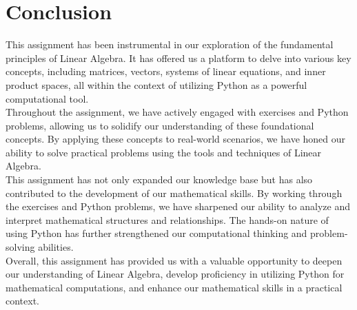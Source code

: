 \clearpage
\section{ Conclusion}
This assignment has been instrumental in our exploration of the fundamental principles of Linear Algebra. It has offered us a platform to delve into various key concepts, including matrices, vectors, systems of linear equations, and inner product spaces, all within the context of utilizing Python as a powerful computational tool.\\[6pt]
Throughout the assignment, we have actively engaged with exercises and Python problems, allowing us to solidify our understanding of these foundational concepts. By applying these concepts to real-world scenarios, we have honed our ability to solve practical problems using the tools and techniques of Linear Algebra.\\[6pt]
This assignment has not only expanded our knowledge base but has also contributed to the development of our mathematical skills. By working through the exercises and Python problems, we have sharpened our ability to analyze and interpret mathematical structures and relationships. The hands-on nature of using Python has further strengthened our computational thinking and problem-solving abilities.\\[6pt]
Overall, this assignment has provided us with a valuable opportunity to deepen our understanding of Linear Algebra, develop proficiency in utilizing Python for mathematical computations, and enhance our mathematical skills in a practical context.\\[6pt]